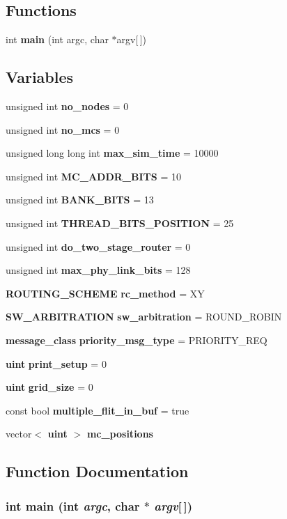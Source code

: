 \subsection*{Functions}
\begin{CompactItemize}
\item 
int {\bf main} (int argc, char $\ast$argv[$\,$])
\end{CompactItemize}
\subsection*{Variables}
\begin{CompactItemize}
\item 
unsigned int {\bf no\_\-nodes} = 0
\item 
unsigned int {\bf no\_\-mcs} = 0
\item 
unsigned long long int {\bf max\_\-sim\_\-time} = 10000
\item 
unsigned int {\bf MC\_\-ADDR\_\-BITS} = 10
\item 
unsigned int {\bf BANK\_\-BITS} = 13
\item 
unsigned int {\bf THREAD\_\-BITS\_\-POSITION} = 25
\item 
unsigned int {\bf do\_\-two\_\-stage\_\-router} = 0
\item 
unsigned int {\bf max\_\-phy\_\-link\_\-bits} = 128
\item 
{\bf ROUTING\_\-SCHEME} {\bf rc\_\-method} = XY
\item 
{\bf SW\_\-ARBITRATION} {\bf sw\_\-arbitration} = ROUND\_\-ROBIN
\item 
{\bf message\_\-class} {\bf priority\_\-msg\_\-type} = PRIORITY\_\-REQ
\item 
{\bf uint} {\bf print\_\-setup} = 0
\item 
{\bf uint} {\bf grid\_\-size} = 0
\item 
const bool {\bf multiple\_\-flit\_\-in\_\-buf} = true
\item 
vector$<$ {\bf uint} $>$ {\bf mc\_\-positions}
\end{CompactItemize}


\subsection{Function Documentation}
\subsubsection[{main}]{\setlength{\rightskip}{0pt plus 5cm}int main (int {\em argc}, \/  char $\ast$ {\em argv}[$\,$])}\label{simMc2Mesh_8cc_0ddf1224851353fc92bfbff6f499fa97}




